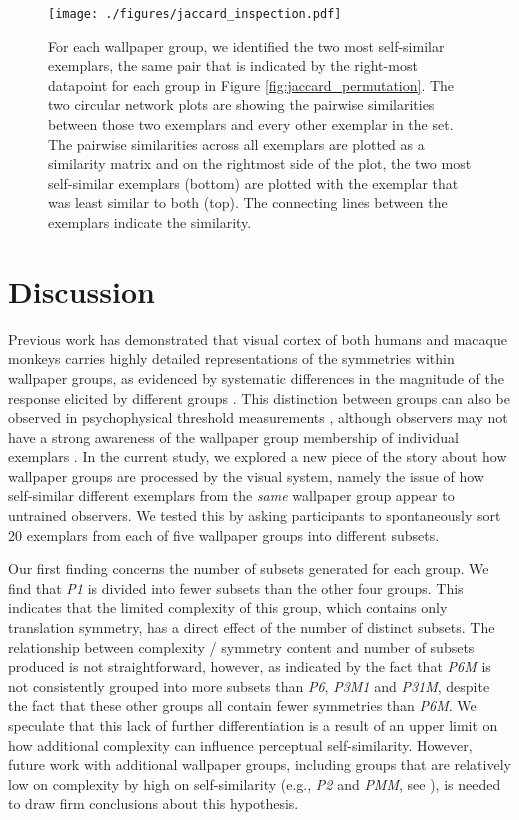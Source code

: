 \documentclass[11pt, twoside]{article}
\begin{document}
\begin{figure}[hbt!]
	\centering
	\texttt{[image: ./figures/jaccard\_inspection.pdf]}
	\caption{For each wallpaper group, we identified the two most self-similar exemplars, the same pair that is indicated by the right-most datapoint for each group in Figure \ref{fig:jaccard_permutation}. The two circular network plots are showing the pairwise similarities between those two exemplars and every other exemplar in the set. The pairwise similarities across all exemplars are plotted as a similarity matrix and on the rightmost side of the plot, the two most self-similar exemplars (bottom) are plotted with the exemplar that was least similar to both (top). The connecting lines between the exemplars indicate the similarity.}
	\label{fig:jaccard_inspection}
\end{figure}

\section*{Discussion}
Previous work has demonstrated that visual cortex of both humans and macaque monkeys carries highly detailed representations of the symmetries within wallpaper groups, as evidenced by systematic differences in the magnitude of the response elicited by different groups \citep{RN1725,kohler_clarke_2021,audurier_symmetry_2021}. This distinction between groups can also be observed in psychophysical threshold measurements \citep{kohler_clarke_2021}, although observers may not have a strong awareness of the wallpaper group membership of individual exemplars \citep{RN172}. In the current study, we explored a new piece of the story about how wallpaper groups are processed by the visual system, namely the issue of how self-similar different exemplars from the \textit{same} wallpaper group appear to untrained observers. We tested this by asking participants to spontaneously sort 20 exemplars from each of five wallpaper groups into different subsets. 

Our first finding concerns the number of subsets generated for each group. We find that \textit{P1} is divided into fewer subsets than the other four groups. This indicates that the limited complexity of this group, which contains only translation symmetry, has a direct effect of the number of distinct subsets. The relationship between complexity / symmetry content and number of subsets produced is not straightforward, however, as indicated by the fact that \textit{P6M} is not consistently grouped into more subsets than \textit{P6}, \textit{P3M1} and \textit{P31M}, despite the fact that these other groups all contain fewer symmetries than \textit{P6M}. We speculate that this lack of further differentiation is a result of an upper limit on how additional complexity can influence perceptual self-similarity. However, future work with additional wallpaper groups, including groups that are relatively low on complexity by high on self-similarity (e.g., \textit{P2} and \textit{PMM}, see \citep{RN172}), is needed to draw firm conclusions about this hypothesis.
\end{document}
